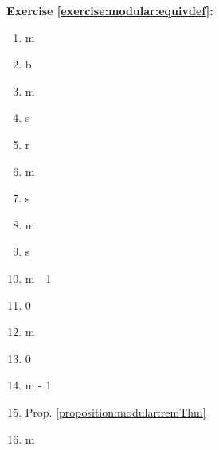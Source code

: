 \noindent\textbf{Exercise \ref{exercise:modular:equivdef}:} %
\begin{multicols}{4}
\begin{enumerate}
\item
m

\item
b

\item
m

\item
s

\item
r

\item
m

\item
s

\item
m

\item
s

\item
m - 1

\item
0

\item
m

\item
0

\item
m - 1

\item
Prop. \ref{proposition:modular:remThm} 

\item
m
\end{enumerate}
\end{multicols}

